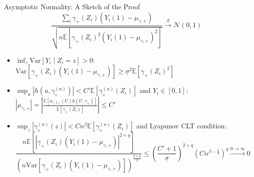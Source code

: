  \begin{frame}{Asymptotic Normality: A Sketch of the Proof}
    $$
    \frac{\sum_{i}\gamma_{+}\left(Z_{i}\right)\left(Y_{i}\left(1\right)-\mu_{\gamma,+}\right)}{\sqrt{n\mathbb{E}\left[\gamma_{+}\left(Z_{i}\right)^{2}\left(Y_{i}\left(1\right)-\mu_{\gamma,+}\right)^{2}\right]}} \xrightarrow{d} \mathcal{N}(0,1)
    $$

    \begin{itemize}
        \footnotesize
        \item \textcolor{mygreen}{$\boxed{\inf_{z}\mathrm{Var}\left[Y_{i}\mid Z_{i}=z\right]>0}$}: $\mathrm{Var}\left[\gamma_{+}\left(Z_{i}\right)\left(Y_{i}\left(1\right)-\mu_{\gamma,+}\right)\right] \geq \underline{\sigma}^{2} \mathbb{E}\left[\gamma_{+}\left(Z_{i}\right)^{2}\right]$
        \item \textcolor{mygreen}{${\boxed{\sup_{u}\left|h\left(u,\gamma_{\diamond}^{\left(n\right)}\right)\right|<C'\mathbb{E}\left[\gamma_{\diamond}^{\left(n\right)}\left(Z_{i}\right)\right]}}$} and \textcolor{mygreen}{$\boxed{Y_{i}\in\left[0,1\right]}$}: $\left|\mu_{\gamma,+}\right|=\left|\frac{\mathbb{E}\left[\alpha_{\left(1\right)}\left(U\right)h\left(U,\gamma_{+}\right)\right]}{\mathbb{E}\left[\gamma_{+}\left(Z_{i}\right)\right]}\right| \leq C'$
        \item \textcolor{mygreen}{$\boxed{\sup_{z}\left|\gamma_{\diamond}^{\left(n\right)}\left(z\right)\right|<Cn^{\beta}  \mathbb{E} \left[\gamma_{\diamond}^{\left(n\right)}\left(Z_{i}\right)\right]}$} and \textcolor{mygreen}{Lyapunov CLT condition}: {\scriptsize $$\frac{n\mathbb{E}\left[\left|\gamma_{+}\left(Z_{i}\right)\left(Y_{i}\left(1\right)-\mu_{\gamma,+}\right)\right|^{2+q}\right]}{\left(n\mathrm{Var}\left[\gamma_{+}\left(Z_{i}\right)\left(Y_{i}\left(1\right)-\mu_{\gamma,+}\right)\right]\right)^{\frac{2+q}{2}}} \leq\left(\frac{C'+1}{\underline{\sigma}}\right)^{2+q}\left(Cn^{\beta-\frac{1}{2}}\right)^{q}\xrightarrow{0\rightarrow\infty} 0$$}
    \end{itemize}
 \end{frame}

